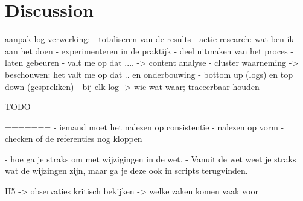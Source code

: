 \newpage
\section{Discussion} \label{Discussion}

aanpak log verwerking:
- totaliseren van de results
- actie research: wat ben ik aan het doen
- experimenteren in de praktijk
- deel uitmaken van het proces
- laten gebeuren
- valt me op dat .... -> content analyse
- cluster waarneming -> beschouwen: het valt me op dat .. en onderbouwing
- bottom up (logs) en top down (gesprekken)
- bij elk log -> wie wat waar; traceerbaar houden







TODO


=======
- iemand moet het nalezen op consistentie
- nalezen op vorm
- checken of de referenties nog kloppen


- hoe ga je straks om met wijzigingen in de wet. 
- Vanuit de wet weet je straks wat de wijzingen zijn, maar ga je deze ook in scripts terugvinden.



H5 -> observaties kritisch  bekijken -> welke zaken komen vaak voor

